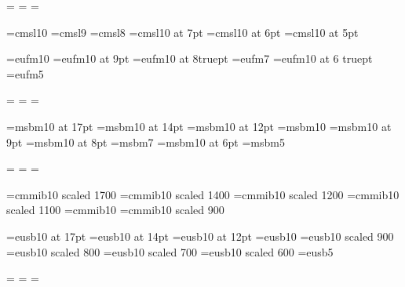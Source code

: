 \newfam\scalnfam
\textfont\scalnfam=\tenscaln
\scriptfont\scalnfam=\sevenscaln
\scriptscriptfont\scalnfam=\fivescaln

\def\scal{\fam\scalnfam\tenscaln}

% 
\font\tensl=cmsl10
\font\ninesl=cmsl9                 
\font\eightsl=cmsl8
\font\sevensl=cmsl10 at 7pt
\font\sixsl=cmsl10 at 6pt
\font\fivesl=cmsl10 at 5pt



\font\tengot=eufm10                       
\font\ninegot=eufm10 at 9pt
\font\eightgot=eufm10 at 8truept
\font\sevengot=eufm7
\font\sixgot=eufm10 at 6 truept
\font\fivegot=eufm5

\newfam\gotfam
\textfont\gotfam=\tengot
\scriptfont\gotfam=\sevengot
\scriptscriptfont\gotfam=\fivegot
\def\got{\fam\gotfam\tengot}


\font\seventeenbb=msbm10 at 17pt     
\font\fourteenbb=msbm10 at 14pt
\font\twelvebb=msbm10 at 12pt
\font\tenbb=msbm10                   
\font\ninebb=msbm10 at 9pt
\font\eightbb=msbm10 at 8pt
\font\sevenbb=msbm7
\font\sixbb=msbm10 at 6pt
\font\fivebb=msbm5

\newfam\bbfam
\textfont\bbfam=\tenbb
\scriptfont\bbfam=\sevenbb
\scriptscriptfont\bbfam=\fivebb

\def\bb{\fam\bbfam\tenbb}


% 

\font\seventeenib=cmmib10 scaled 1700
\font\fourteenib=cmmib10 scaled 1400
\font\twelveib=cmmib10 scaled 1200
\font\elevenib=cmmib10 scaled 1100
\font\tenib=cmmib10
\font\nineib=cmmib10 scaled 900


\font\seventeenscalb=eusb10  at 17pt 
\font\fourteenscalb=eusb10 at 14pt
\font\twelvescalb=eusb10 at 12pt
\font\tenscalb=eusb10      
\font\ninescalb=eusb10 scaled 900
\font\eightscalb=eusb10 scaled 800
\font\sevenscalb=eusb10 scaled 700
\font\sixscalb=eusb10 scaled 600
\font\fivescalb=eusb5

\newfam\scalbfam
\textfont\scalbfam=\tenscalb
\scriptfont\scalbfam=\sevenscalb
\scriptscriptfont\scalbfam=\fivescalb

